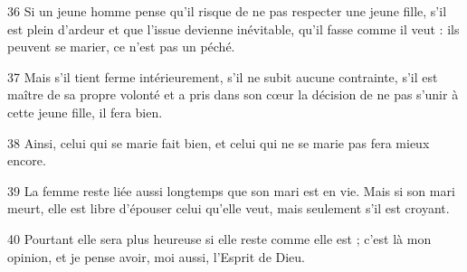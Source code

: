 
36 Si un jeune homme pense qu’il risque de ne pas respecter une jeune fille, s’il est plein d’ardeur et que l’issue devienne inévitable, qu’il fasse comme il veut : ils peuvent se marier, ce n’est pas un péché.

37 Mais s’il tient ferme intérieurement, s’il ne subit aucune contrainte, s’il est maître de sa propre volonté et a pris dans son cœur la décision de ne pas s’unir à cette jeune fille, il fera bien.

38 Ainsi, celui qui se marie fait bien, et celui qui ne se marie pas fera mieux encore.

39 La femme reste liée aussi longtemps que son mari est en vie. Mais si son mari meurt, elle est libre d’épouser celui qu’elle veut, mais seulement s’il est croyant.

40 Pourtant elle sera plus heureuse si elle reste comme elle est ; c’est là mon opinion, et je pense avoir, moi aussi, l’Esprit de Dieu.